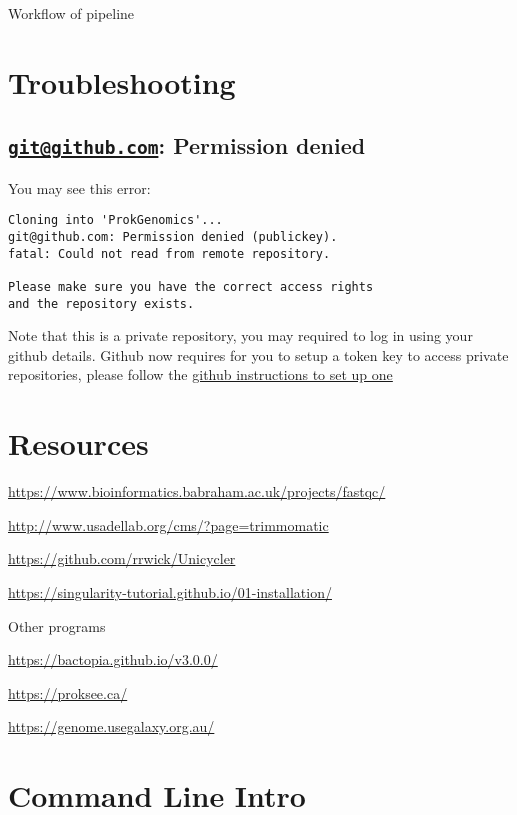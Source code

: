\documentclass[
]{book}
\begin{document}
Workflow of pipeline

\hypertarget{troubleshooting}{%
\chapter{Troubleshooting}\label{troubleshooting}}

\hypertarget{gitgithub.com-permission-denied}{%
\section{\texorpdfstring{\href{mailto:git@github.com}{\nolinkurl{git@github.com}}: Permission denied}{git@github.com: Permission denied}}\label{gitgithub.com-permission-denied}}

You may see this error:

\begin{verbatim}
Cloning into 'ProkGenomics'...
git@github.com: Permission denied (publickey).
fatal: Could not read from remote repository.

Please make sure you have the correct access rights
and the repository exists.
\end{verbatim}

Note that this is a private repository, you may required to log in using your github details. Github now requires for you to setup a token key to access private repositories, please follow the \href{https://docs.github.com/en/authentication/keeping-your-account-and-data-secure/managing-your-personal-access-tokens}{github instructions to set up one}

\hypertarget{resources}{%
\chapter{Resources}\label{resources}}

\url{https://www.bioinformatics.babraham.ac.uk/projects/fastqc/}

\url{http://www.usadellab.org/cms/?page=trimmomatic}

\url{https://github.com/rrwick/Unicycler}

\url{https://singularity-tutorial.github.io/01-installation/}

Other programs

\url{https://bactopia.github.io/v3.0.0/}

\url{https://proksee.ca/}

\url{https://genome.usegalaxy.org.au/}

\hypertarget{command-line-intro}{%
\chapter{Command Line Intro}\label{command-line-intro}}
\end{document}

